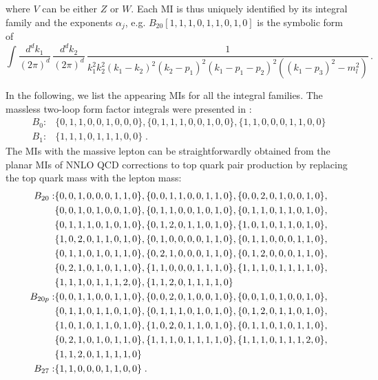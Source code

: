 \documentclass[11pt,a4paper]{article}
\begin{document}
%
where $V$ can be either $Z$ or $W$.
%
Each MI is thus uniquely identified by its integral family and the exponents $\alpha_j$,
e.g. $B_{20}[1,1,1,0,1,1,0,1,0 ]$ is the symbolic form of
%
\begin{equation}
 \int \frac{d^dk_1}{(2\pi)^d}\,  \frac{d^dk_2}{(2\pi)^d}\,
\frac{ 1 }{
   k_1^2    k_2^2   (k_1-k_2)^2
  (k_2-p_1)^2  (k_1-p_1-p_2)^2   ( (k_1-p_3)^2 -m_l^2) } \,.
\end{equation}
%
%
%

In the following, we list the appearing MIs for all the integral families.
The massless two-loop form factor integrals were presented in \cite{Gehrmann:2005pd}:
\begin{align}
B_{0} :&
\{0, 1, 1, 0, 0, 1, 0, 0, 0\}, \{0, 1, 1, 1, 0, 0, 1, 0, 0\}, \{1, 1, 0, 0, 0, 1, 1, 0, 0\}
%
\nonumber \\
B_{1} :&
\{1, 1, 1, 0, 1, 1, 1, 0, 0\}\;.
% 
\label{eq:miB0B1}
\end{align}
%
The MIs with the massive lepton can be straightforwardly obtained from the planar MIs \cite{Bonciani:2008az, Bonciani:2009nb}
of NNLO QCD corrections to top
quark pair production by replacing the top quark mass with the lepton mass:
\begin{align}
B_{20} :&
\{0, 0, 1, 0, 0, 0, 1, 1, 0\}, \{0, 0, 1, 1, 0, 0, 1, 1, 0\}, \{0, 0, 2, 0, 1, 0, 0, 1, 0\},  \nn
\{0, 0, 1, 0, 1, 0, 0, 1, 0\}, \{0, 1, 1, 0, 0, 1, 0, 1, 0\}, \{0, 1, 1, 0, 1, 1, 0, 1, 0\},  \nn
\{0, 1, 1, 1, 0, 1, 0, 1, 0\}, \{0, 1, 2, 0, 1, 1, 0, 1, 0\}, \{1, 0, 1, 0, 1, 1, 0, 1, 0\},  \nn
\{1, 0, 2, 0, 1, 1, 0, 1, 0\}, \{0, 1, 0, 0, 0, 0, 1, 1, 0\}, \{0, 1, 1, 0, 0, 0, 1, 1, 0\},  \nn
\{0, 1, 1, 0, 1, 0, 1, 1, 0\}, \{0, 2, 1, 0, 0, 0, 1, 1, 0\}, \{0, 1, 2, 0, 0, 0, 1, 1, 0\},  \nn
\{0, 2, 1, 0, 1, 0, 1, 1, 0\}, \{1, 1, 0, 0, 0, 1, 1, 1, 0\}, \{1, 1, 1, 0, 1, 1, 1, 1, 0\},  \nn
\{1, 1, 1, 0, 1, 1, 1, 2, 0\}, \{1, 1, 2, 0, 1, 1, 1, 1, 0\}
\nonumber \\
%
B_{20p} :&
\{0, 0, 1, 1, 0, 0, 1, 1, 0\}, \{0, 0, 2, 0, 1, 0, 0, 1, 0\}, \{0, 0, 1, 0, 1, 0, 0, 1, 0\},  \nn
\{0, 1, 1, 0, 1, 1, 0, 1, 0\}, \{0, 1, 1, 1, 0, 1, 0, 1, 0\}, \{0, 1, 2, 0, 1, 1, 0, 1, 0\},  \nn
\{1, 0, 1, 0, 1, 1, 0, 1, 0\}, \{1, 0, 2, 0, 1, 1, 0, 1, 0\}, \{0, 1, 1, 0, 1, 0, 1, 1, 0\},  \nn
\{0, 2, 1, 0, 1, 0, 1, 1, 0\}, \{1, 1, 1, 0, 1, 1, 1, 1, 0\}, \{1, 1, 1, 0, 1, 1, 1, 2, 0\},  \nn
\{1, 1, 2, 0, 1, 1, 1, 1, 0\}
\nonumber\\
%
B_{27} :& \{1, 1, 0, 0, 0, 1, 1, 0, 0\}\;.
% 
\label{eq:miB20}
\end{align}
\end{document}
